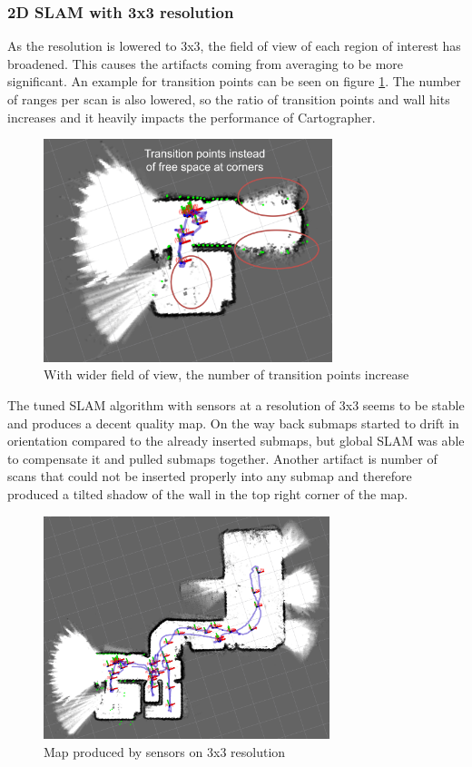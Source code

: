 \subsubsection{2D SLAM with 3x3 resolution}
As the resolution is lowered to 3x3, the field of view of each region of interest has broadened.
This causes the artifacts coming from averaging to be more significant. An example for transition 
points can be seen on figure \ref{fig:03_artifacts}. The number of ranges per scan is also lowered,
so the ratio of transition points and wall hits increases and it heavily impacts the performance of
Cartographer.

\begin{figure}[!h]
    \centering
	\includegraphics[height=65mm, keepaspectratio]{figures/03_artifacts.png}
    \caption{With wider field of view, the number of transition points increase}
    \label{fig:03_artifacts}
\end{figure}

The tuned SLAM algorithm with sensors at a resolution of 3x3 seems to be stable and produces a 
decent quality map. On the way back submaps started to drift in orientation compared to the 
already inserted submaps, but global SLAM was able to compensate it and pulled submaps together.
Another artifact is number of scans that could not be inserted properly into any submap and 
therefore produced a tilted shadow of the wall in the top right corner of the map.

\begin{figure}[!h]
    \centering
	\includegraphics[height=65mm, keepaspectratio]{figures/03_map.png}
    \caption{Map produced by sensors on 3x3 resolution}
    \label{fig:03_map}
\end{figure}


